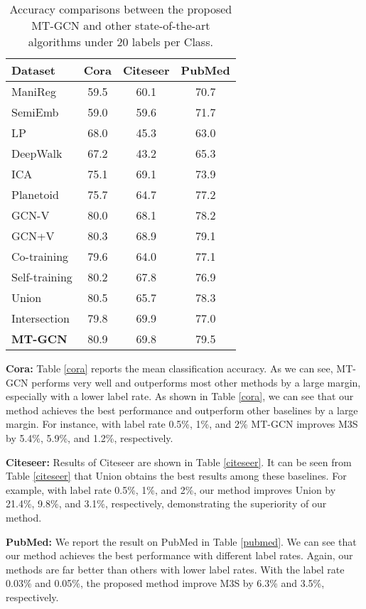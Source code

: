 \documentclass{article}
\begin{document}
\begin{table}[!ht]
\caption{Accuracy comparisons between the proposed MT-GCN and other state-of-the-art algorithms under 20 labels per Class.}
\label{twenty}
\centering
\begin{tabular}{l|ccc}
\hline
Dataset         &Cora       &Citeseer   &PubMed \\
\hline
ManiReg         &59.5       &60.1       &70.7   \\
SemiEmb         &59.0       &59.6       &71.7   \\
LP              &68.0       &45.3       &63.0   \\
DeepWalk        &67.2       &43.2       &65.3   \\
ICA             &75.1       &69.1       &73.9   \\
Planetoid       &75.7       &64.7       &77.2   \\
GCN-V           &80.0       &68.1       &78.2   \\
GCN+V           &80.3       &68.9       &79.1   \\
Co-training     &79.6       &64.0       &77.1   \\
Self-training   &80.2       &67.8       &76.9   \\
Union           &80.5       &65.7       &78.3   \\
Intersection    &79.8       &69.9       &77.0   \\
\bf MT-GCN      &80.9       &69.8       &79.5   \\
\hline
\end{tabular}
\end{table}

{\bf Cora:} Table \ref{cora} reports the mean classification accuracy. As we can see, MT-GCN performs very well and outperforms most other methods by a large margin, especially with a lower label rate. As shown in Table \ref{cora}, we can see that our method achieves the best performance and outperform other baselines by a large margin.  For instance, with label rate 0.5\%, 1\%, and 2\% MT-GCN improves M3S by 5.4\%, 5.9\%, and 1.2\%, respectively.

{\bf Citeseer:} Results of Citeseer are shown in Table \ref{citeseer}. It can be seen from Table \ref{citeseer} that Union obtains the best results among these baselines. For example, with label rate 0.5\%, 1\%, and 2\%, our method improves Union by 21.4\%, 9.8\%, and 3.1\%, respectively, demonstrating the superiority of our method.

{\bf PubMed:} We report the result on PubMed in Table \ref{pubmed}. We can see that our method achieves the best performance with different label rates. Again, our methods are far better than others with lower label rates. With the label rate 0.03\% and 0.05\%, the proposed method improve M3S by 6.3\% and 3.5\%, respectively.
\end{document}
